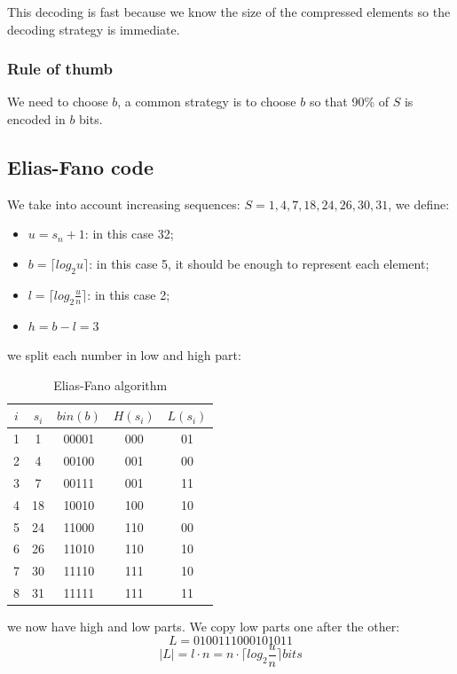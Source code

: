 This decoding is fast because we know the size of the compressed elements so the decoding strategy is immediate.

\subsubsection{Rule of thumb}
We need to choose $b$, a common strategy is to choose $b$ so that 90\% of $S$ is encoded in $b$ bits.

\subsection{Elias-Fano code}
We take into account increasing sequences: $S= 1, 4, 7, 18, 24, 26, 30, 31$, we define:
\begin{itemize}
    \item $u = s_n +1$: in this case 32;
    \item $b = \lceil log_2 u \rceil$: in this case 5, it should be enough to represent each element;
    \item $l = \lceil log_2 \frac{u}{n} \rceil$: in this case 2;
    \item $h = b-l = 3$
\end{itemize}
we split each number in low and high part:
\begin{table}[H]
    \centering
    \begin{tabular}{c|c|c|c|c}
        $i$ & $s_i$ & $bin(b)$ & $H(s_i)$ & $L(s_i)$ \\
        \hline
        1 & 1 & 00001 & 000 & 01 \\
        2 & 4 & 00100 & 001 & 00 \\
        3 & 7 & 00111 & 001 & 11 \\
        4 & 18 & 10010 & 100 & 10 \\
        5 & 24 & 11000 & 110 & 00 \\
        6 & 26 & 11010 & 110 & 10 \\
        7 & 30 & 11110 & 111 & 10 \\
        8 & 31 & 11111 & 111 & 11 \\
    \end{tabular}
    \caption{Elias-Fano algorithm}
\end{table}
we now have high and low parts.
We copy low parts one after the other:
$$
    L= 01 00 11 10 00 10 10 11
$$
$$
    |L| = l \cdot n = n \cdot \lceil log_2 \frac{u}{n} \rceil bits
$$

